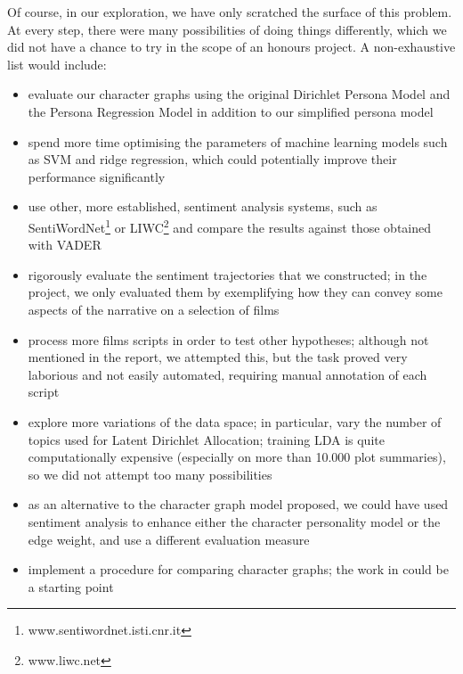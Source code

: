 \documentclass[bsc,frontabs,deptreport,singlespacing,parskip, twoside]{infthesis}
\begin{document}
Of course, in our exploration, we have only scratched the surface of this problem. At every step, there were many possibilities of doing things differently, which we did not have a chance to try in the scope of an honours project. A non-exhaustive list would include:
\begin{itemize}
	\item evaluate our character graphs using the original Dirichlet Persona Model and the Persona Regression Model in addition to our simplified persona model
	\item spend more time optimising the parameters of machine learning models such as SVM and ridge regression, which could potentially improve their performance significantly
	\item use other, more established, sentiment analysis systems, such as SentiWordNet\footnote{www.sentiwordnet.isti.cnr.it} or LIWC\footnote{www.liwc.net} and compare the results against those obtained with \textsc{VADER}
	\item rigorously evaluate the sentiment trajectories that we constructed; in the project, we only evaluated them by exemplifying how they can convey some aspects of the narrative on a selection of films
	\item process more films scripts in order to test other hypotheses; although not mentioned in the report, we attempted this, but the task proved very laborious and not easily automated, requiring manual annotation of each script
	\item explore more variations of the data space; in particular, vary the number of topics used for Latent Dirichlet Allocation; training LDA is quite computationally expensive (especially on more than 10.000 plot summaries), so we did not attempt too many possibilities
	\item as an alternative to the character graph model proposed, we could have used sentiment analysis to enhance either the character personality model or the edge weight, and use a different evaluation measure
	\item implement a procedure for comparing character graphs; the work in \cite{elsner2012character} could be a starting point
\end{itemize}
\end{document}
